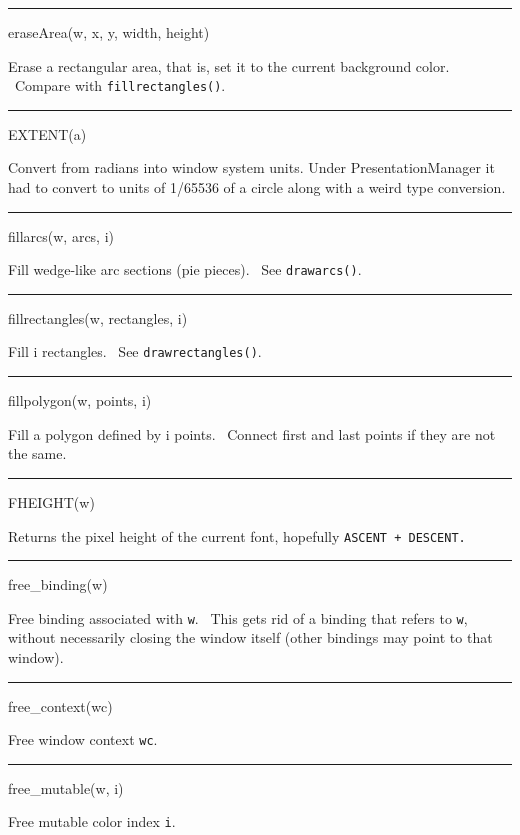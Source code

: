 {\sffamily\bfseries
\bigskip\hrule\vspace{0.1cm}
\noindent
eraseArea(w, x, y, width, height)}


Erase a rectangular area, that is, set it to the current background color. \ Compare with \texttt{fillrectangles()}.


{\sffamily\bfseries
\bigskip\hrule\vspace{0.1cm}
\noindent
EXTENT(a)}


Convert from radians into window system units. Under
PresentationManager it had to convert to units of 1/65536 of a circle
along with a weird type conversion.


{\sffamily\bfseries
\bigskip\hrule\vspace{0.1cm}
\noindent
fillarcs(w, arcs, i)}


Fill wedge-like arc sections (pie pieces). \ See \texttt{drawarcs()}.


{\sffamily\bfseries
\bigskip\hrule\vspace{0.1cm}
\noindent
fillrectangles(w, rectangles, i)}


Fill i rectangles. \ See \texttt{drawrectangles()}.


{\sffamily\bfseries
\bigskip\hrule\vspace{0.1cm}
\noindent
fillpolygon(w, points, i)}


Fill a polygon defined by i points. \ Connect first and last points if they are not the same.


{\sffamily\bfseries
\bigskip\hrule\vspace{0.1cm}
\noindent
FHEIGHT(w)}


Returns the pixel height of the current font, hopefully \texttt{ASCENT + DESCENT.}


{\sffamily\bfseries
\bigskip\hrule\vspace{0.1cm}
\noindent
free\_binding(w)}


Free binding associated with \texttt{w}. \ This gets rid of a binding that refers to \texttt{w}, without necessarily
closing the window itself (other bindings may point to that window).


{\sffamily\bfseries
\bigskip\hrule\vspace{0.1cm}
\noindent
free\_context(wc)}


Free window context \texttt{wc}.


{\sffamily\bfseries
\bigskip\hrule\vspace{0.1cm}
\noindent
free\_mutable(w, i)}


Free mutable color index \texttt{i}.


